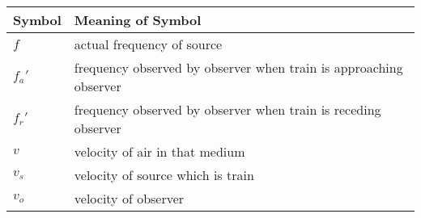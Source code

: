 
\begin{tabular}{ | m{3.4em} | m{5cm} | } 
  \hline
 \textbf{Symbol} & \textbf{Meaning of Symbol}  \\
 \hline
 $f$ & actual frequency of source  \\
\hline
$f_a'$ & frequency observed by observer when train is approaching observer  \\
\hline
 $f_r'$ &  frequency observed by observer when train is receding observer  \\
\hline
 $v$ & velocity of air in that medium  \\
\hline
$v_s$ & velocity of source which is train  \\
\hline
$v_o$ & velocity of observer  \\
\hline
\end{tabular}

